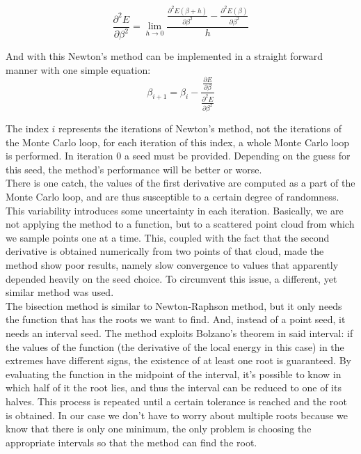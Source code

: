 		\begin{equation}\frac{\partial^2 E}{\partial\beta^2}=\lim_{h\to 0}\frac{\frac{\partial^2 E\left(\beta+h\right)}{\partial\beta^2}-\frac{\partial^2 E\left(\beta\right)}{\partial\beta^2}}{h}\end{equation}

		And with this Newton's method can be implemented in a straight forward manner with one simple equation:\\

		\begin{equation}\beta_{i+1}=\beta_i-\frac{\frac{\partial E}{\partial\beta}}{\frac{\partial^2 E}{\partial\beta^2}}\end{equation}

		The index $i$ represents the iterations of Newton's method, not the iterations of the Monte Carlo loop, for each iteration of this index, a whole Monte Carlo loop is performed. In iteration $0$ a seed must be provided. Depending on the guess for this seed, the method's performance will be better or worse.\\

		There is one catch, the values of the first derivative are computed as a part of the Monte Carlo loop, and are thus susceptible to a certain degree of randomness. This variability introduces some uncertainty in each iteration. Basically, we are not applying the method to a function, but to a scattered point cloud from which we sample points one at a time. This, coupled with the fact that the second derivative is obtained numerically from two points of that cloud, made the method show poor results, namely slow convergence to values that apparently depended heavily on the seed choice. To circumvent this issue, a different, yet similar method was used.\\

		The bisection method is similar to Newton-Raphson method, but it only needs the function that has the roots we want to find. And, instead of a point seed, it needs an interval seed. The method exploits Bolzano's theorem in said interval: if the values of the function (the derivative of the local energy in this case) in the extremes have different signs, the existence of at least one root is guaranteed. By evaluating the function in the midpoint of the interval, it's possible to know in which half of it the root lies, and thus the interval can be reduced to one of its halves. This process is repeated until a certain tolerance is reached and the root is obtained. In our case we don't have to worry about multiple roots because we know that there is only one minimum, the only problem is choosing the appropriate intervals so that the method can find the root.\\

